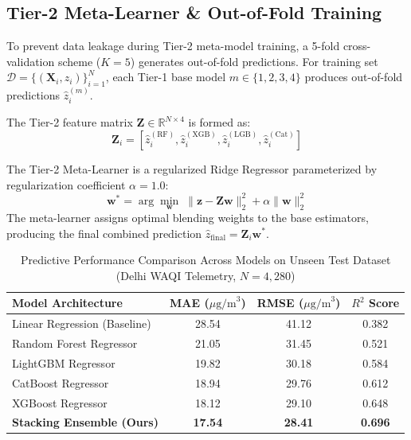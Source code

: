 \documentclass[journal]{IEEEtran}
\begin{document}
\subsection{Tier-2 Meta-Learner \& Out-of-Fold Training}
To prevent data leakage during Tier-2 meta-model training, a 5-fold cross-validation scheme ($K=5$) generates out-of-fold predictions. For training set $\mathcal{D} = \{(\mathbf{X}_i, z_i)\}_{i=1}^N$, each Tier-1 base model $m \in \{1, 2, 3, 4\}$ produces out-of-fold predictions $\hat{z}_i^{(m)}$.

The Tier-2 feature matrix $\mathbf{Z} \in \mathbb{R}^{N \times 4}$ is formed as:
\begin{equation}
\mathbf{Z}_i = \left[\hat{z}_i^{(\text{RF})}, \hat{z}_i^{(\text{XGB})}, \hat{z}_i^{(\text{LGB})}, \hat{z}_i^{(\text{Cat})}\right]
\end{equation}

The Tier-2 Meta-Learner is a regularized Ridge Regressor \cite{hoerl1970} parameterized by regularization coefficient $\alpha=1.0$:
\begin{equation}
\mathbf{w}^* = \arg\min_{\mathbf{w}} \; \|\mathbf{z} - \mathbf{Z}\mathbf{w}\|_2^2 + \alpha \|\mathbf{w}\|_2^2
\end{equation}
The meta-learner assigns optimal blending weights to the base estimators, producing the final combined prediction $\hat{z}_{\text{final}} = \mathbf{Z}_i \mathbf{w}^*$.

\begin{table}[!t]
\caption{Predictive Performance Comparison Across Models on Unseen Test Dataset (Delhi WAQI Telemetry, $N=4,280$)}
\label{table:performance}
\centering
\begin{tabular}{lccc}
\toprule
\textbf{Model Architecture} & \textbf{MAE ($\mu\text{g/m}^3$)} & \textbf{RMSE ($\mu\text{g/m}^3$)} & \textbf{$R^2$ Score} \\
\midrule
Linear Regression (Baseline) & 28.54 & 41.12 & 0.382 \\
Random Forest Regressor       & 21.05 & 31.45 & 0.521 \\
LightGBM Regressor          & 19.82 & 30.18 & 0.584 \\
CatBoost Regressor           & 18.94 & 29.76 & 0.612 \\
XGBoost Regressor            & 18.12 & 29.10 & 0.648 \\
\textbf{Stacking Ensemble (Ours)} & \textbf{17.54} & \textbf{28.41} & \textbf{0.696} \\
\bottomrule
\end{tabular}
\end{table}
\end{document}
